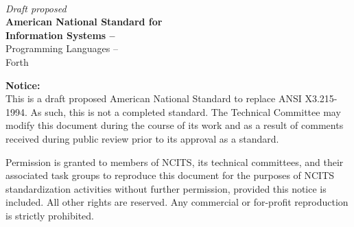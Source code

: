 \begin{titlepage}
\begin{flushright}
\textbf{\docversion} \\[1in]
\LARGE
\textit{Draft proposed}\\
\textbf{American National Standard for} \\
\textbf{Information Systems --}\\[.5in]
Programming Languages -- \\
Forth
\end{flushright}
\vfill

\textbf{Notice:} \\
This is a draft proposed American National Standard to replace
ANSI X3.215-1994. As such, this is not a completed standard. The
Technical Committee may modify this document during the course
of its work and as a result of comments received during public
review prior to its approval as a standard.

Permission is granted to members of NCITS, its technical committees,
and their associated task groups to reproduce this document for the
purposes of NCITS standardization activities without further permission,
provided this notice is included. All other rights are reserved. Any
commercial or for-profit reproduction is strictly prohibited.
\end{titlepage}
